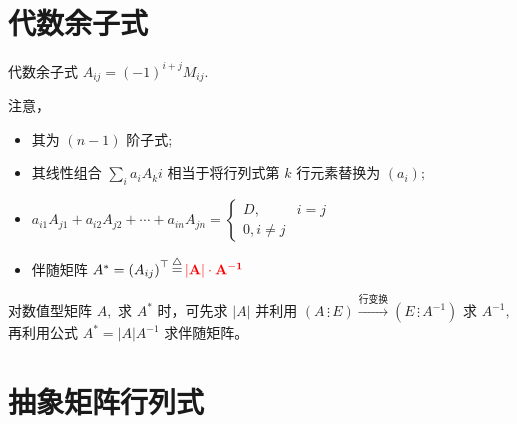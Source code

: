 \section{代数余子式}

代数余子式 $ A_{ij} = (-1)^{i+j}M_{ij}. $ 

注意，
\begin{itemize}
    \item 其为 $ (n-1) $ 阶子式;
    \item 其线性组合 $ \sum_i a_iA_ki $ 相当于将行列式第 $ k $ 行元素替换为 $ (a_i); $
    \item $ a_{i1}A_{j1} + a_{i2}A_{j2} + \cdots + a_{in}A_{jn} =
    \begin{cases}D,&i=j\\ 0,i\neq j\end{cases} $ 
    \item 伴随矩阵 $ A^* = \left(A_{ij}\right)^\top\mathop=\limits^\triangle \textcolor{red}{\bf{|A|\cdot A^{-1}}}$ 
\end{itemize}

对数值型矩阵 $ A, $ 求 $ A^* $ 时，可先求 $ |A| $ 并利用 $ (A\, \vdots\, E)\xrightarrow{\textrm{行变换}}
(E\, \vdots\, A^{-1}) $ 
求 $ A^{-1}, $ 再利用公式 $ A^* = |A|A^{-1} $ 求伴随矩阵。

\section{抽象矩阵行列式}


